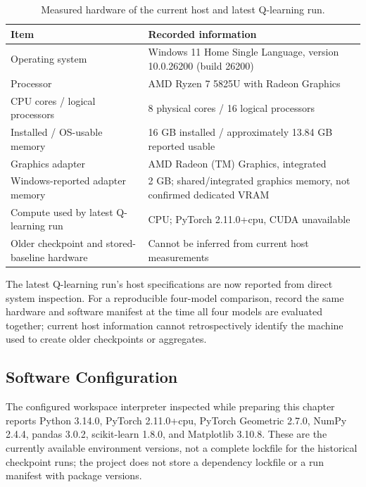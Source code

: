 \documentclass[12pt,a4paper]{report}
\begin{document}
\begin{table}[htbp]
\centering
\caption{Measured hardware of the current host and latest Q-learning run.}
\begin{tabularx}{\textwidth}{>{\raggedright\arraybackslash}p{}X}
\toprule
\textbf{Item} & \textbf{Recorded information} \\
\midrule
Operating system & Windows 11 Home Single Language, version 10.0.26200 (build 26200) \\
Processor & AMD Ryzen 7 5825U with Radeon Graphics \\
CPU cores / logical processors & 8 physical cores / 16 logical processors \\
Installed / OS-usable memory & 16 GB installed / approximately 13.84 GB reported usable \\
Graphics adapter & AMD Radeon (TM) Graphics, integrated \\
Windows-reported adapter memory & 2 GB; shared/integrated graphics memory, not confirmed dedicated VRAM \\
Compute used by latest Q-learning run & CPU; PyTorch 2.11.0+cpu, CUDA unavailable \\
Older checkpoint and stored-baseline hardware & Cannot be inferred from current host measurements \\
\bottomrule
\end{tabularx}
\end{table}

The latest Q-learning run's host specifications are now reported from direct system inspection. For a reproducible four-model comparison, record the same hardware and software manifest at the time all four models are evaluated together; current host information cannot retrospectively identify the machine used to create older checkpoints or aggregates.

\subsection{Software Configuration}

The configured workspace interpreter inspected while preparing this chapter reports Python 3.14.0, PyTorch 2.11.0+cpu, PyTorch Geometric 2.7.0, NumPy 2.4.4, pandas 3.0.2, scikit-learn 1.8.0, and Matplotlib 3.10.8. These are the currently available environment versions, not a complete lockfile for the historical checkpoint runs; the project does not store a dependency lockfile or a run manifest with package versions.
\end{document}
